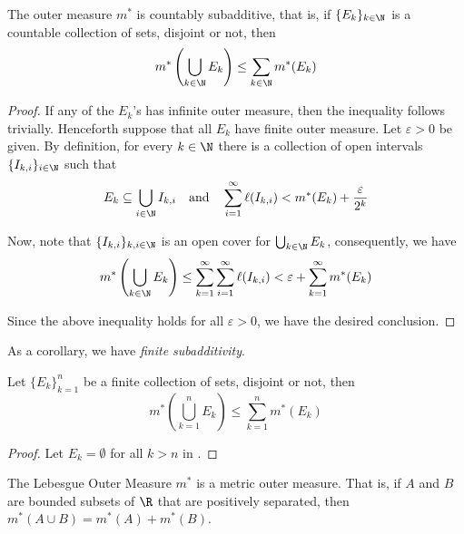 \begin{proposition}
    The outer measure $m^*$ is countably subadditive, that is, if $\{E_k\}_{k\in\N}$ is a countable collection of sets, disjoint or not, then 
    \begin{equation*}
        m^*\left(\bigcup_{k\in\N}E_k\right)\le\sum_{k\in\N}m^*(E_k)
    \end{equation*}
\end{proposition}
\begin{proof}
    If any of the $E_k$'s has infinite outer measure, then the inequality follows trivially. Henceforth suppose that all $E_k$ have finite outer measure. Let $\varepsilon > 0$ be given. By definition, for every $k\in\N$ there is a collection of open intervals $\{I_{k,i}\}_{i\in\N}$ such that 
    \begin{equation*}
        E_k\subseteq\bigcup_{i\in\N} I_{k,i}\quad\text{and}\quad\sum_{i = 1}^\infty\ell(I_{k,i}) < m^*(E_k) + \frac{\varepsilon}{2^k}
    \end{equation*}

    Now, note that $\{I_{k,i}\}_{k,i\in\N}$ is an open cover for $\bigcup_{k\in\N} E_k$, consequently, we have 
    \begin{equation*}
        m^*\left(\bigcup_{k\in\N} E_k\right)\le\sum_{k = 1}^\infty\sum_{i = 1}^\infty\ell(I_{k,i}) < \varepsilon + \sum_{k = 1}^\infty m^*(E_k)
    \end{equation*}

    Since the above inequality holds for all $\varepsilon > 0$, we have the desired conclusion.
\end{proof}

As a corollary, we have \textit{finite subadditivity}. 
\begin{corollary}
    Let $\{E_k\}_{k = 1}^n$ be a finite collection of sets, disjoint or not, then 
    \begin{equation*}
        m^*\left(\bigcup_{k = 1}^n E_k\right)\le\sum_{k = 1}^n m^*(E_k)
    \end{equation*}
\end{corollary}
\begin{proof}
    Let $E_k = \emptyset$ for all $k > n$ in .
\end{proof}

\begin{theorem}
    The Lebesgue Outer Measure $m^*$ is a metric outer measure. That is, if $A$ and $B$ are bounded subsets of $\R$ that are positively separated, then $m^*(A\cup B) = m^*(A) + m^*(B)$.
\end{theorem}

